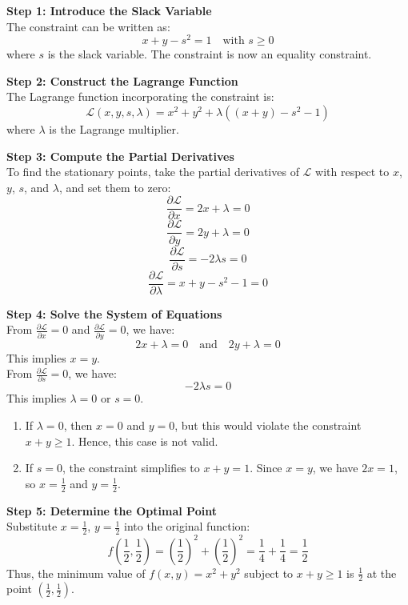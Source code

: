 \documentclass[]{article}
\begin{document}
	\textbf{Step 1: Introduce the Slack Variable}\\
	The constraint can be written as:
	$$
	x + y - s^2 = 1 \quad \text{with } s \geq 0
	$$
	where $s$ is the slack variable.
	The constraint is now an equality constraint.
	
	\textbf{Step 2: Construct the Lagrange Function}\\
	The Lagrange function incorporating the constraint is:
	$$
	\mathcal{L}(x, y, s, \lambda) = x^2 + y^2 + \lambda \left( (x + y) - s^2 - 1 \right)
	$$
	where $\lambda$ is the Lagrange multiplier.
	
	\textbf{Step 3: Compute the Partial Derivatives}\\
	To find the stationary points, take the partial derivatives of $\mathcal{L}$ with respect to $x$, $y$, $s$, and $\lambda$, and set them to zero:
	$$
	\frac{\partial \mathcal{L}}{\partial x} = 2x + \lambda = 0
	$$
	$$
	\frac{\partial \mathcal{L}}{\partial y} = 2y + \lambda = 0
	$$
	$$
	\frac{\partial \mathcal{L}}{\partial s} = -2\lambda s = 0
	$$
	$$
	\frac{\partial \mathcal{L}}{\partial \lambda} = x + y - s^2 - 1 = 0
	$$
	
	\textbf{Step 4: Solve the System of Equations}\\
	From $\frac{\partial \mathcal{L}}{\partial x} = 0$ and $\frac{\partial \mathcal{L}}{\partial y} = 0$, we have:
	$$
	2x + \lambda = 0 \quad \text{and} \quad 2y + \lambda = 0
	$$
	This implies $x = y$.\\
	From $\frac{\partial \mathcal{L}}{\partial s} = 0$, we have:
	$$
	-2\lambda s = 0
	$$
	This implies $\lambda = 0$ or $s = 0$. 
	
	\begin{enumerate}
		\item If $\lambda = 0$, then $x = 0$ and $y = 0$, but this would violate the constraint $x + y \geq 1$.
		Hence, this case is not valid.
		\item If $s = 0$, the constraint simplifies to $x + y = 1$.
		Since $x = y$, we have $2x = 1$, so $x = \frac{1}{2}$ and $y = \frac{1}{2}$.
	\end{enumerate}
	
	\textbf{Step 5: Determine the Optimal Point}\\
	Substitute $x = \frac{1}{2}$, $y = \frac{1}{2}$ into the original function:
	$$
	f\left(\frac{1}{2}, \frac{1}{2}\right) = \left(\frac{1}{2}\right)^2 + \left(\frac{1}{2}\right)^2 = \frac{1}{4} + \frac{1}{4} = \frac{1}{2}
	$$
	Thus, the minimum value of $f(x, y) = x^2 + y^2$ subject to $x + y \geq 1$ is $\frac{1}{2}$ at the point $\left(\frac{1}{2}, \frac{1}{2}\right)$.
	
	
\end{document}
